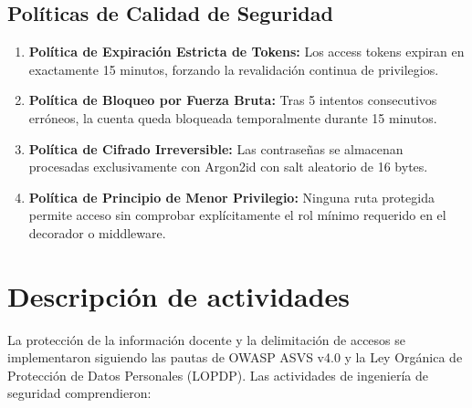 \documentclass[12pt,a4paper]{article}
\begin{document}
\subsection{Políticas de Calidad de Seguridad}
\begin{enumerate}[leftmargin=1.5em, itemsep=2pt]
    \item \textbf{Política de Expiración Estricta de Tokens:} Los access tokens expiran en exactamente 15 minutos, forzando la revalidación continua de privilegios.
    \item \textbf{Política de Bloqueo por Fuerza Bruta:} Tras 5 intentos consecutivos erróneos, la cuenta queda bloqueada temporalmente durante 15 minutos.
    \item \textbf{Política de Cifrado Irreversible:} Las contraseñas se almacenan procesadas exclusivamente con Argon2id con salt aleatorio de 16 bytes.
    \item \textbf{Política de Principio de Menor Privilegio:} Ninguna ruta protegida permite acceso sin comprobar explícitamente el rol mínimo requerido en el decorador o middleware.
\end{enumerate}

\section{Descripción de actividades}
La protección de la información docente y la delimitación de accesos se implementaron siguiendo las pautas de OWASP ASVS v4.0 y la Ley Orgánica de Protección de Datos Personales (LOPDP). Las actividades de ingeniería de seguridad comprendieron:
\end{document}
